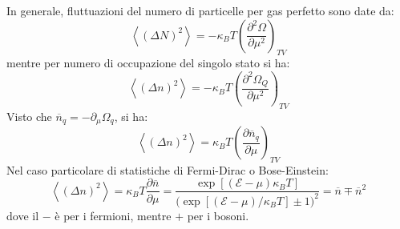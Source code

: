 \documentclass[10pt, a4paper]{scrartcl}
\numberwithin{equation}{subsection}
\theoremstyle{style1}
\begin{document}
In generale, fluttuazioni del numero di particelle per gas perfetto sono date da:
\begin{equation}
	\left\langle (\Delta N)^2 \right\rangle = - \kappa _B T \left(\frac{\partial ^2 \Omega }{\partial \mu ^2} \right) _{TV} 
\end{equation}
mentre per numero di occupazione del singolo stato si ha:
\begin{equation}
	\left\langle (\Delta n) ^2 \right\rangle= - \kappa _B T \left(\frac{\partial^2 \Omega _Q}{\partial \mu ^2} \right) _{TV} 
\end{equation}
Visto che $\overline{n}_q = -\partial _\mu  \Omega _q$, si ha:
\begin{equation}
	\left\langle (\Delta n)^2 \right\rangle = \kappa _B T \left(\frac{\partial \overline{n}_q}{\partial \mu  } \right) _{TV} 
\end{equation}
Nel caso particolare di statistiche di Fermi-Dirac o Bose-Einstein:
\begin{equation}
	\left\langle (\Delta n)^2 \right\rangle = \kappa _B T \frac{\partial \overline{n}}{\partial \mu } = \frac{\exp \left[ (\mathscr{E}-\mu ) \kappa _B T \right] }{\big(\exp\left[ (\mathscr{E}-\mu ) / \kappa _B T \right] \pm 1\big)^2} = \overline{n} \mp \overline{n}^2
\end{equation}
dove il $-$ \`e per i fermioni, mentre $+$ per i bosoni.
\end{document}
